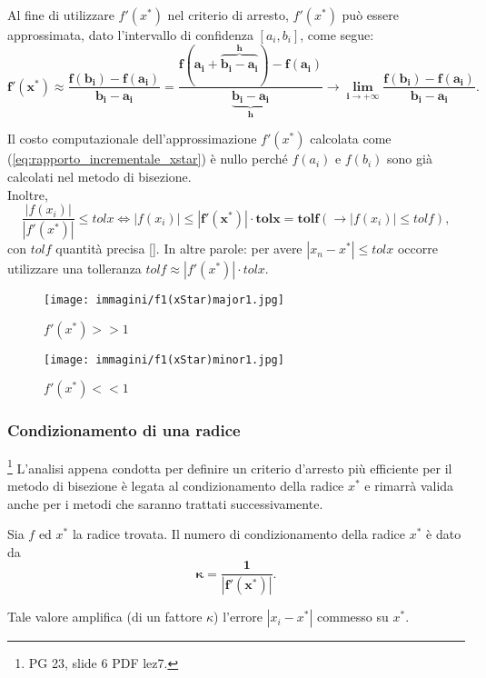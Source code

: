 Al fine di utilizzare $f'(x^*)$ nel criterio di arresto, $f'(x^*)$ può essere approssimata, dato l'intervallo di confidenza $[a_i, b_i]$, come segue:
\begin{equation}\label{eq:rapporto_incrementale_xstar}
	\boldsymbol{f'(x^*)\approx\frac{f(b_i)-f(a_i)}{b_i-a_i}=\frac{f(a_i+\overbrace{b_i-a_i}^{h})-f(a_i)}{\underbrace{b_i-a_i}_{h}}\rightarrow \lim_{i\to + \infty}\frac{f(b_i)-f(a_i)}{b_i-a_i}}.
\end{equation}

\begin{remark}
	Il costo computazionale dell'approssimazione $f'(x^*)$ calcolata come (\ref{eq:rapporto_incrementale_xstar}) è nullo perché $f(a_i)$ e $f(b_i)$ sono già calcolati nel metodo di bisezione.\\
	Inoltre,
	\begin{equation*}
		\frac{|f(x_i)|}{|f'(x^*)|}\leq tolx \iff |f(x_i)|\leq \boldsymbol{|f'(x^*)|\cdot tolx=tolf}(\rightarrow |f(x_i)|\leq tolf),
	\end{equation*}
	con ${tolf}$ quantità precisa [\footnotemark]. In altre parole: per avere $|x_n-x^*|\leq tolx$ occorre utilizzare una tolleranza $tolf\approx|f'(x^*)|\cdot tolx$.
\end{remark}

\begin{figure}
	\centering
	\texttt{[image: immagini/f1(xStar)major1.jpg]}
	\caption{\label{fig:f1(xStar)major1.jpg}$f'(x^*)>>1$}
\end{figure}
\begin{figure}
	\centering
	\texttt{[image: immagini/f1(xStar)minor1.jpg]}
	\caption{\label{fig:f1(xStar)minor1.jpg} $f'(x^*)<<1$}
\end{figure}

\subsubsection{Condizionamento di una radice}\footnote{PG 23, slide 6 PDF lez7.} L'analisi appena condotta per definire un criterio d'arresto più efficiente per il metodo di bisezione è legata al condizionamento della radice $x^*$ e rimarrà valida anche per i metodi che saranno trattati successivamente.

\begin{definition}\label{def:numero_condizionamento_radice}
	Sia $f$ ed $x^*$ la radice trovata. Il numero di condizionamento della radice $x^*$ è dato da
	\begin{equation}\label{eq:defK}
		\boldsymbol{\kappa =\frac{1}{|f'(x^*)|}.}
	\end{equation}
\end{definition}
Tale valore amplifica (di un fattore $\kappa$) l'errore $|x_i-x^*|$ commesso su $x^*$.

